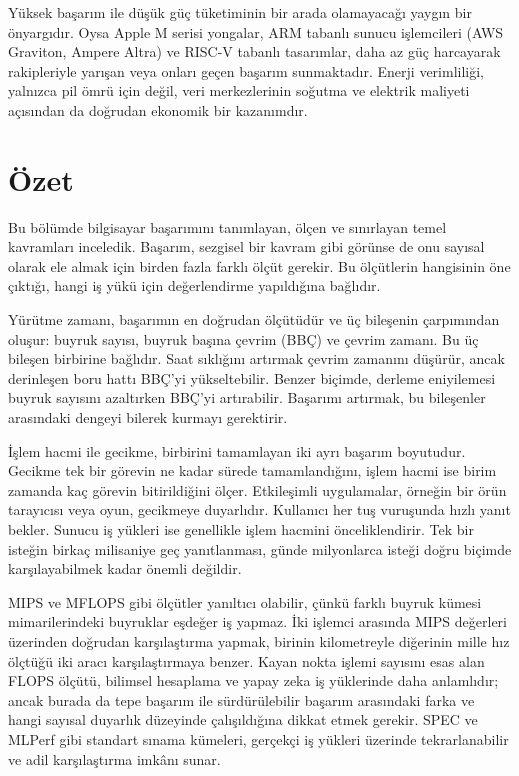 Yüksek başarım ile düşük güç tüketiminin bir arada olamayacağı yaygın bir önyargıdır. Oysa Apple M serisi yongalar, ARM tabanlı sunucu işlemcileri (AWS Graviton, Ampere Altra) ve RISC-V tabanlı tasarımlar, daha az güç harcayarak rakipleriyle yarışan veya onları geçen başarım sunmaktadır. Enerji verimliliği, yalnızca pil ömrü için değil, veri merkezlerinin soğutma ve elektrik maliyeti açısından da doğrudan ekonomik bir kazanımdır.


\section{Özet}
\label{sec:basarim-ozet}

Bu bölümde bilgisayar başarımını tanımlayan, ölçen ve sınırlayan temel kavramları inceledik. Başarım, sezgisel bir kavram gibi görünse de onu sayısal olarak ele almak için birden fazla farklı ölçüt gerekir. Bu ölçütlerin hangisinin öne çıktığı, hangi iş yükü için değerlendirme yapıldığına bağlıdır.

Yürütme zamanı, başarımın en doğrudan ölçütüdür ve üç bileşenin çarpımından oluşur: buyruk sayısı, buyruk başına çevrim (BBÇ) ve çevrim zamanı. Bu üç bileşen birbirine bağlıdır. Saat sıklığını artırmak çevrim zamanını düşürür, ancak derinleşen boru hattı BBÇ'yi yükseltebilir. Benzer biçimde, derleme eniyilemesi buyruk sayısını azaltırken BBÇ'yi artırabilir. Başarımı artırmak, bu bileşenler arasındaki dengeyi bilerek kurmayı gerektirir.

İşlem hacmi ile gecikme, birbirini tamamlayan iki ayrı başarım boyutudur. Gecikme tek bir görevin ne kadar sürede tamamlandığını, işlem hacmi ise birim zamanda kaç görevin bitirildiğini ölçer. Etkileşimli uygulamalar, örneğin bir örün tarayıcısı veya oyun, gecikmeye duyarlıdır. Kullanıcı her tuş vuruşunda hızlı yanıt bekler. Sunucu iş yükleri ise genellikle işlem hacmini önceliklendirir. Tek bir isteğin birkaç milisaniye geç yanıtlanması, günde milyonlarca isteği doğru biçimde karşılayabilmek kadar önemli değildir.

MIPS ve MFLOPS gibi ölçütler yanıltıcı olabilir, çünkü farklı buyruk kümesi mimarilerindeki buyruklar eşdeğer iş yapmaz. İki işlemci arasında MIPS değerleri üzerinden doğrudan karşılaştırma yapmak, birinin kilometreyle diğerinin mille hız ölçtüğü iki aracı karşılaştırmaya benzer. Kayan nokta işlemi sayısını esas alan FLOPS ölçütü, bilimsel hesaplama ve yapay zeka iş yüklerinde daha anlamlıdır; ancak burada da tepe başarım ile sürdürülebilir başarım arasındaki farka ve hangi sayısal duyarlık düzeyinde çalışıldığına dikkat etmek gerekir. SPEC ve MLPerf gibi standart sınama kümeleri, gerçekçi iş yükleri üzerinde tekrarlanabilir ve adil karşılaştırma imkânı sunar.

